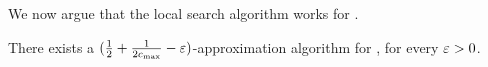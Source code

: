 
We now argue that the local search algorithm works for \gcp.

\begin{theorem}
There exists a $(\frac{1}{2} + \frac{1}{2c_{\max}} - \varepsilon)$-approximation algorithm
for \gcp, for every $\varepsilon>0$.
\end{theorem}


